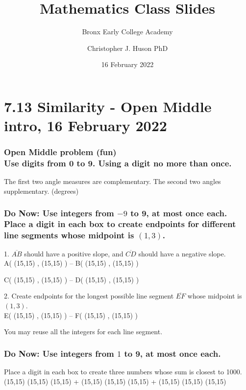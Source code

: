 \documentclass{beamer}
\title{Mathematics Class Slides}
\subtitle{Bronx Early College Academy}
\author{Christopher J. Huson PhD}
\date{16 February 2022}
\begin{document}
\frame{\titlepage}
\section[Outline]{}
\frame{\tableofcontents}

\section{7.13 Similarity - Open Middle intro, 16 February 2022}


\frame
{
  \frametitle{Open Middle problem (fun) \\
  Use digits from 0 to 9. Using a digit no more than once.}
    The first two angle measures are complementary. The second two angles supplementary. (degrees)\\[0.75cm]
       \vspace{5cm} 
}

\frame
{
  \frametitle{Do Now:
  Use integers from $-9$ to 9, at most once each.
  Place a digit in each box to create endpoints for different line segments whose midpoint is $(1, 3)$.}
  
  1. $\overline{AB}$ should have a positive slope, and $\overline{CD}$ should have a negative slope. \\[0.25cm]

  \Large{A(} \framebox(15,15){} , \framebox(15,15){} \Large{)} -- 
  \Large{B(} \framebox(15,15){} , \framebox(15,15){} \Large{)} 

  \Large{C(} \framebox(15,15){} , \framebox(15,15){} \Large{)} -- 
  \Large{D(} \framebox(15,15){} , \framebox(15,15){} \Large{)} \vspace{0.25cm}

  2. Create endpoints for the longest possible line segment $\overline{EF}$ whose midpoint is $(1, 3)$.\\[0.25cm]

  \Large{E(} \framebox(15,15){} , \framebox(15,15){} \Large{)} -- 
  \Large{F(} \framebox(15,15){} , \framebox(15,15){} \Large{)}

  You may reuse all the integers for each line segment.
}


\frame
{
  \frametitle{Do Now:
  Use integers from $1$ to 9, at most once each.}
  Place a digit in each box to create three numbers whose sum is closest to 1000.\\[0.75cm]

 \framebox(15,15){} \framebox(15,15){} \framebox(15,15){} \Large{+}
 \framebox(15,15){} \framebox(15,15){} \framebox(15,15){} \Large{+}
 \framebox(15,15){} \framebox(15,15){} \framebox(15,15){}
}
\end{document}
